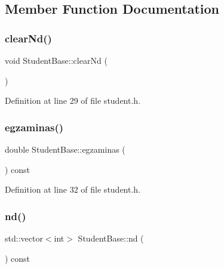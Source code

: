 \subsection{Member Function Documentation}
\mbox{\label{class_student_base_a3776b744979f4f34968ef407503f44a8}} 
\subsubsection{\texorpdfstring{clearNd()}{clearNd()}}
{\footnotesize\ttfamily void Student\+Base\+::clear\+Nd (\begin{DoxyParamCaption}{ }\end{DoxyParamCaption})\hspace{0.3cm}{\ttfamily [inline]}}



Definition at line 29 of file student.\+h.

\mbox{\label{class_student_base_a250eda1d2180e7d61ca3f3930417cf06}} 
\subsubsection{\texorpdfstring{egzaminas()}{egzaminas()}}
{\footnotesize\ttfamily double Student\+Base\+::egzaminas (\begin{DoxyParamCaption}{ }\end{DoxyParamCaption}) const\hspace{0.3cm}{\ttfamily [inline]}}



Definition at line 32 of file student.\+h.

\mbox{\label{class_student_base_aff680a22b1f9240273612335b94f58c4}} 
\subsubsection{\texorpdfstring{nd()}{nd()}}
{\footnotesize\ttfamily std\+::vector$<$int$>$ Student\+Base\+::nd (\begin{DoxyParamCaption}{ }\end{DoxyParamCaption}) const\hspace{0.3cm}{\ttfamily [inline]}}



